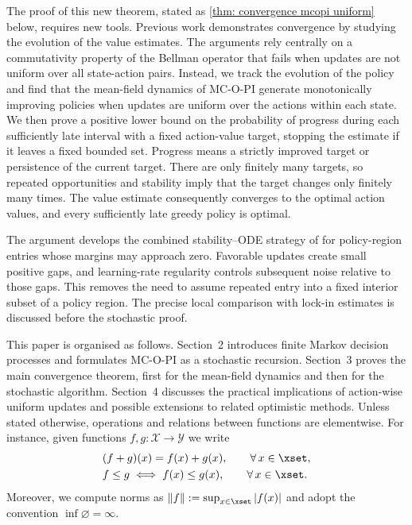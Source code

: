 

The proof of this new theorem, stated as \autoref{thm: convergence mcopi uniform} below, requires new tools. 
Previous work demonstrates convergence by studying the evolution of the value estimates. The arguments rely centrally on a commutativity property of the Bellman operator that fails when updates are not uniform over all state-action pairs.
Instead, we track the evolution of the policy and find that the mean-field dynamics of MC-O-PI generate monotonically improving policies when updates are uniform over the actions within each state.
We then prove a positive lower bound on the probability of progress during each sufficiently late interval with a fixed action-value target, stopping the estimate if it leaves a fixed bounded set. Progress means a strictly improved target or persistence of the current target. There are only finitely many targets, so repeated opportunities and stability imply that the target changes only finitely many times. The value estimate consequently converges to the optimal action values, and every sufficiently late greedy policy is optimal.

The argument develops the combined stability--ODE strategy of \citet[Section~5.4]{Kushner2003StochasticApplications} for policy-region entries whose margins may approach zero. Favorable updates create small positive gaps, and learning-rate regularity controls subsequent noise relative to those gaps. This removes the need to assume repeated entry into a fixed interior subset of a policy region. The precise local comparison with lock-in estimates is discussed before the stochastic proof.

This paper is organised as follows. Section~2 introduces finite Markov decision
processes and formulates MC-O-PI as a stochastic recursion. Section~3 proves the
main convergence theorem, first for the mean-field dynamics and then for the stochastic
algorithm. Section~4 discusses the practical implications of action-wise uniform updates
and possible extensions to related optimistic methods. 
Unless stated otherwise, operations and relations between functions are elementwise. For instance, given functions $f, g : \mathcal X \to \mathcal Y$ we write
\begin{align*}
&(f + g)(x) = f(x) + g(x), \qquad \forall \, x \in \xset ,
    \\
&f \le g \iff f(x) \le g(x), \qquad \forall \, x \in \xset .
\end{align*}
Moreover, we compute norms as $\|f\| := \sup_{x \in \xset} |f(x)|$ 
and adopt the convention $\inf \varnothing = \infty$.


